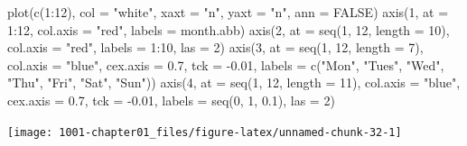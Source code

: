\documentclass[
]{book}
\newenvironment{Shaded}{\begin{snugshade}}{\end{snugshade}}
\newcommand{\AttributeTok}[1]{\textcolor[rgb]{0.77,0.63,0.00}{#1}}
\newcommand{\ConstantTok}[1]{\textcolor[rgb]{0.00,0.00,0.00}{#1}}
\newcommand{\DecValTok}[1]{\textcolor[rgb]{0.00,0.00,0.81}{#1}}
\newcommand{\FloatTok}[1]{\textcolor[rgb]{0.00,0.00,0.81}{#1}}
\newcommand{\FunctionTok}[1]{\textcolor[rgb]{0.00,0.00,0.00}{#1}}
\newcommand{\NormalTok}[1]{#1}
\newcommand{\SpecialCharTok}[1]{\textcolor[rgb]{0.00,0.00,0.00}{#1}}
\newcommand{\StringTok}[1]{\textcolor[rgb]{0.31,0.60,0.02}{#1}}
\begin{document}
\begin{Shaded}
\begin{Highlighting}[]
\FunctionTok{plot}\NormalTok{(}\FunctionTok{c}\NormalTok{(}\DecValTok{1}\SpecialCharTok{:}\DecValTok{12}\NormalTok{), }\AttributeTok{col =} \StringTok{"white"}\NormalTok{, }\AttributeTok{xaxt =} \StringTok{"n"}\NormalTok{, }\AttributeTok{yaxt =} \StringTok{"n"}\NormalTok{, }\AttributeTok{ann =} \ConstantTok{FALSE}\NormalTok{)}
\FunctionTok{axis}\NormalTok{(}\DecValTok{1}\NormalTok{, }\AttributeTok{at =} \DecValTok{1}\SpecialCharTok{:}\DecValTok{12}\NormalTok{, }\AttributeTok{col.axis =} \StringTok{"red"}\NormalTok{, }\AttributeTok{labels =}\NormalTok{ month.abb)}
\FunctionTok{axis}\NormalTok{(}\DecValTok{2}\NormalTok{, }\AttributeTok{at =} \FunctionTok{seq}\NormalTok{(}\DecValTok{1}\NormalTok{, }\DecValTok{12}\NormalTok{, }\AttributeTok{length =} \DecValTok{10}\NormalTok{), }\AttributeTok{col.axis =} \StringTok{"red"}\NormalTok{, }\AttributeTok{labels =} \DecValTok{1}\SpecialCharTok{:}\DecValTok{10}\NormalTok{, }\AttributeTok{las =} \DecValTok{2}\NormalTok{)}
\FunctionTok{axis}\NormalTok{(}\DecValTok{3}\NormalTok{, }\AttributeTok{at =} \FunctionTok{seq}\NormalTok{(}\DecValTok{1}\NormalTok{, }\DecValTok{12}\NormalTok{, }\AttributeTok{length =} \DecValTok{7}\NormalTok{), }\AttributeTok{col.axis =} \StringTok{"blue"}\NormalTok{, }\AttributeTok{cex.axis =} \FloatTok{0.7}\NormalTok{, }\AttributeTok{tck =} \SpecialCharTok{{-}}\FloatTok{0.01}\NormalTok{, }
    \AttributeTok{labels =} \FunctionTok{c}\NormalTok{(}\StringTok{"Mon"}\NormalTok{, }\StringTok{"Tues"}\NormalTok{, }\StringTok{"Wed"}\NormalTok{, }\StringTok{"Thu"}\NormalTok{, }\StringTok{"Fri"}\NormalTok{, }\StringTok{"Sat"}\NormalTok{, }\StringTok{"Sun"}\NormalTok{))}
\FunctionTok{axis}\NormalTok{(}\DecValTok{4}\NormalTok{, }\AttributeTok{at =} \FunctionTok{seq}\NormalTok{(}\DecValTok{1}\NormalTok{, }\DecValTok{12}\NormalTok{, }\AttributeTok{length =} \DecValTok{11}\NormalTok{), }\AttributeTok{col.axis =} \StringTok{"blue"}\NormalTok{, }\AttributeTok{cex.axis =} \FloatTok{0.7}\NormalTok{, }\AttributeTok{tck =} \SpecialCharTok{{-}}\FloatTok{0.01}\NormalTok{, }
    \AttributeTok{labels =} \FunctionTok{seq}\NormalTok{(}\DecValTok{0}\NormalTok{, }\DecValTok{1}\NormalTok{, }\FloatTok{0.1}\NormalTok{), }\AttributeTok{las =} \DecValTok{2}\NormalTok{)}
\end{Highlighting}
\end{Shaded}

\begin{center}\texttt{[image: 1001-chapter01\_files/figure-latex/unnamed-chunk-32-1]} \end{center}
\end{document}
